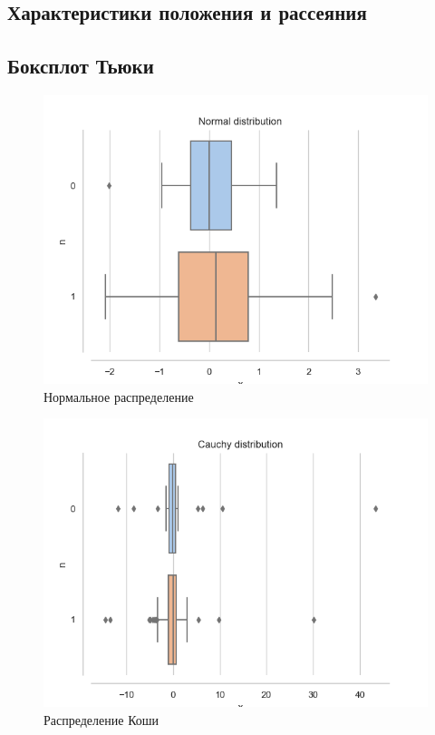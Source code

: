 \documentclass[a4paper,14pt]{article}
\begin{document}
	\subsection{Характеристики положения и рассеяния}
	\subsection{Боксплот Тьюки}
	\begin{figure}[H]
		\centering
		\includegraphics[scale=0.6]{../image/lab3/lab3_norm.png}
		\caption{Нормальное распределение}
		\label{fig:normal}
	\end{figure}
	
	\begin{figure}[H]
		\centering
		\includegraphics[scale=0.6]{../image/lab3/lab3_cauchy.png}
		\caption{Распределение Коши}
		\label{fig:cauchy}
	\end{figure}
	
\end{document}
